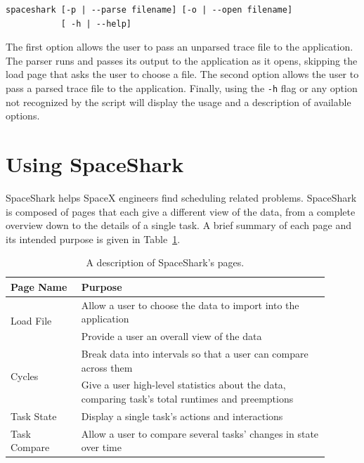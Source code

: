 \documentclass{hmcclinic}
\begin{document}
\begin{verbatim}spaceshark [-p | --parse filename] [-o | --open filename] 
           [ -h | --help]\end{verbatim}

  The first option allows the user to pass an unparsed trace file to the
  application. The parser runs and passes its output 
  to the application as it opens, skipping the load page that asks the
  user to choose a file. The second option allows the user to pass a
  parsed trace file to the application. Finally, using the \texttt{-h} flag or any option
  not recognized by the script will display the usage and a description of
  available options.

\section{Using SpaceShark}

  SpaceShark helps SpaceX engineers find scheduling related problems.
  SpaceShark is composed of pages that each give a different view of the data,
  from a complete overview down to the details of a single task. A brief
  summary of each page and its intended purpose is given in 
  Table~\ref{table:pages}.

\begin{table}[h]
\renewcommand{\arraystretch}{1.5}
  \begin{center}
    \begin{tabular}{p{0.2\linewidth}p{0.7\linewidth}}
     \toprule
      \textbf{Page Name}               & \textbf{Purpose}\\
      \midrule
      \multirow{2}{*}{Load File}       & Allow a user to choose the data to 
        import into the application\\
      Overview                         & Provide a user an overall view of the 
        data\\
      \multirow{2}{*}{Cycles }         & Break data into intervals so that a 
        user can compare across them\\
      \multirow{2}{*}{Task Statistics} & Give a user high-level statistics 
        about the data, comparing task's total runtimes and preemptions\\
      Task State                       & Display a single task's actions and 
        interactions\\
      \multirow{2}{*}{Task Compare}    & Allow a user to compare several tasks' 
        changes in state over time\\
    \bottomrule
    \end{tabular}
  \end{center}
  \vspace{-1em}
  \caption{\label{table:pages} A description of SpaceShark's pages.}
\end{table}
\end{document}
